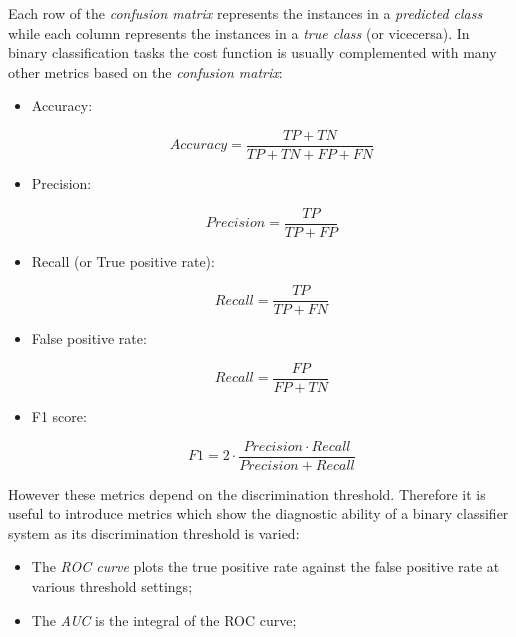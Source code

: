 Each row of the \textit{confusion matrix} represents the instances in a \textit{predicted class} while each column represents the instances 
in a \textit{true class} (or vicecersa).
In binary classification tasks the cost function is usually complemented with many other metrics based on the \textit{confusion matrix}:

\begin{itemize}

\item Accuracy:

\begin{equation}
Accuracy = \frac{TP + TN}{TP + TN + FP + FN}
\end{equation}

\item Precision:

\begin{equation}
Precision = \frac{TP}{TP + FP}
\end{equation}

\item Recall (or True positive rate):

\begin{equation}
Recall = \frac{TP}{TP + FN}
\end{equation}

\item False positive rate:

\begin{equation}
Recall = \frac{FP}{FP + TN}
\end{equation}

\item F1 score:

\begin{equation}
F1 = 2 \cdot \frac{Precision \cdot Recall}{Precision +  Recall}
\end{equation}

\end{itemize}

However these metrics depend on the discrimination threshold.
Therefore it is useful to introduce metrics which show the diagnostic ability of a binary classifier system as its discrimination threshold is varied:

\begin{itemize}

\item The \textit{ROC curve} plots the true positive rate against the false positive rate at various threshold settings;
\item The \textit{AUC} is the integral of the ROC curve;

\end{itemize}


